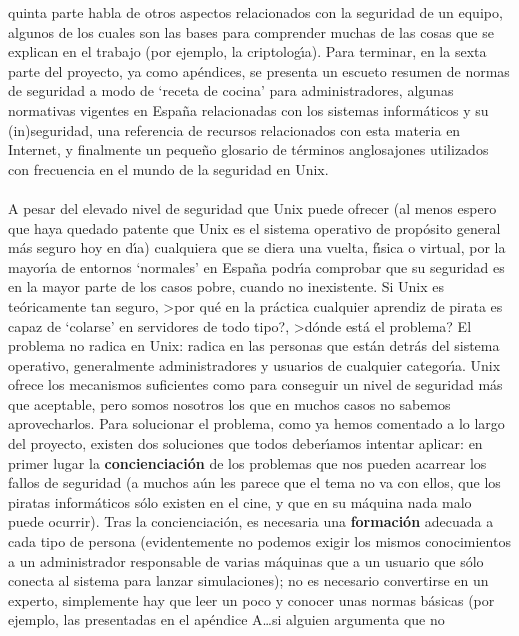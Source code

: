 quinta parte 
habla de otros aspectos relacionados con la seguridad de un equipo, algunos de 
los cuales son las bases para comprender muchas de las cosas que se explican en
el trabajo (por ejemplo, la criptolog\'{\i}a). Para terminar, en la sexta
parte del proyecto, ya como ap\'endices, se presenta un escueto resumen de 
normas de seguridad
a modo de `receta de cocina' para administradores, algunas normativas vigentes
en Espa\~na relacionadas con los sistemas inform\'aticos y su (in)seguridad, una
referencia de recursos relacionados con esta materia en Internet, y finalmente
un peque\~no glosario de t\'erminos anglosajones utilizados con frecuencia en
el mundo de la seguridad en Unix.\\
\\A pesar del elevado nivel de seguridad que Unix puede ofrecer (al menos espero
que haya quedado patente que Unix es el sistema operativo de prop\'osito general
m\'as seguro hoy en d\'{\i}a) cualquiera que se diera una vuelta, f\'{\i}sica o 
virtual, por la mayor\'{\i}a de entornos `normales' en Espa\~na
podr\'{\i}a comprobar que su seguridad es en la mayor parte de los casos pobre, 
cuando no inexistente. Si Unix es te\'oricamente tan seguro, >por qu\'e en la
pr\'actica cualquier aprendiz de pirata es capaz de `colarse' en servidores de 
todo tipo?, >d\'onde est\'a el problema? El problema no radica en Unix: radica 
en las personas que est\'an detr\'as del sistema operativo, generalmente 
administradores y usuarios de cualquier categor\'{\i}a. Unix ofrece los 
mecanismos suficientes como para conseguir un nivel de seguridad m\'as que 
aceptable, pero somos nosotros los que en muchos
casos no sabemos aprovecharlos. Para solucionar el problema, como ya hemos
comentado a lo largo del proyecto, existen dos soluciones que todos 
deber\'{\i}amos intentar aplicar: en primer lugar la {\bf concienciaci\'on} de
los problemas que nos pueden acarrear los fallos de seguridad (a muchos a\'un
les parece que el tema no va con ellos, que los piratas inform\'aticos s\'olo
existen en el cine, y que en su m\'aquina nada malo puede ocurrir). Tras la
concienciaci\'on, es necesaria una {\bf formaci\'on} adecuada a cada tipo de
persona (e\-vi\-den\-te\-men\-te no podemos exigir los mismos conocimientos a 
un administrador responsable de varias m\'aquinas que a un usuario que s\'olo 
conecta al sistema para lanzar simulaciones); no es necesario convertirse en un
experto, simplemente hay que leer un poco y conocer unas normas b\'asicas (por 
ejemplo, las presentadas en el ap\'endice A\ldots si alguien argumenta que no 
